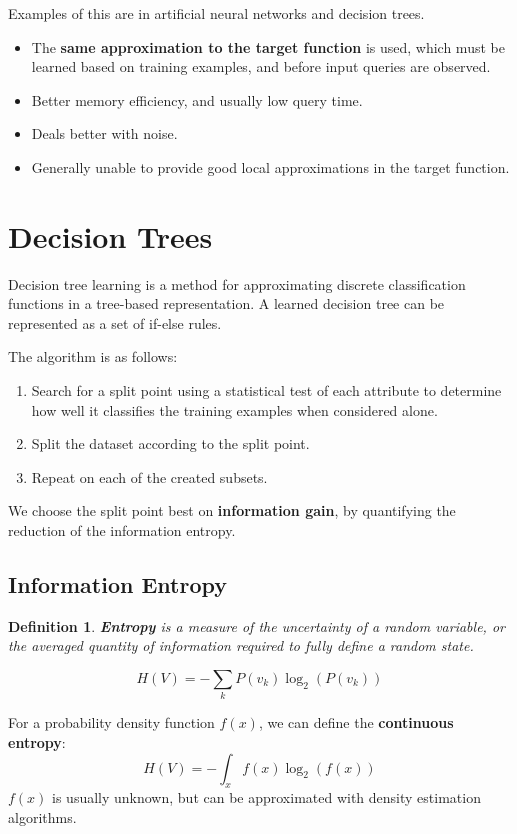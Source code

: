 \documentclass[11pt]{article}
\newtheorem{defn}{Definition}
\begin{document}
Examples of this are in artificial neural networks and decision trees.

\begin{itemize}
  \item The \textbf{same approximation to the target function} is used, which must be learned based on training examples, and before input queries are observed.
  \item Better memory efficiency, and usually low query time.
  \item Deals better with noise.
  \item Generally unable to provide good local approximations in the target function.
\end{itemize}

\section{Decision Trees}
Decision tree learning is a method for approximating discrete classification functions in a tree-based representation.
A learned decision tree can be represented as a set of if-else rules.

The algorithm is as follows:
\begin{enumerate}
  \item Search for a split point using a statistical test of each attribute to determine how well it classifies the training examples when considered alone.
  \item Split the dataset according to the split point.
  \item Repeat on each of the created subsets.
\end{enumerate}

We choose the split point best on \textbf{information gain}, by quantifying the reduction of the information entropy.

\subsection{Information Entropy}
\begin{defn}
  \textbf{Entropy} is a measure of the uncertainty of a random variable, or the averaged quantity of information required to fully define a random state.
\end{defn}

\[
  H(V) = - \sum_k P(v_k) \log_2 (P(v_k))
\]

For a probability density function $f(x)$, we can define the \textbf{continuous entropy}:
\[
  H(V) = - \int_x f(x) \log_2 (f(x))
\]
$f(x)$ is usually unknown, but can be approximated with density estimation algorithms.
\end{document}
